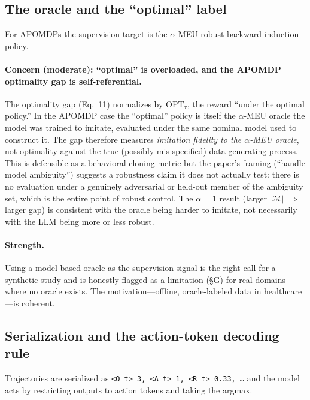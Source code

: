 \documentclass[11pt]{article}
\begin{document}
\subsection{The oracle and the ``optimal'' label}

For APOMDPs the supervision target is the $\alpha$-MEU robust-backward-induction policy.

\paragraph{Concern (moderate): ``optimal'' is overloaded, and the APOMDP optimality gap is
self-referential.} The optimality gap (Eq.\ 11) normalizes by $\mathrm{OPT}_\tau$, the reward
``under the optimal policy.'' In the APOMDP case the ``optimal'' policy is itself the
$\alpha$-MEU oracle the model was trained to imitate, evaluated under the same nominal
model used to construct it. The gap therefore measures \emph{imitation fidelity to the
$\alpha$-MEU oracle}, not optimality against the true (possibly mis-specified) data-generating
process. This is defensible as a behavioral-cloning metric but the paper's framing
(``handle model ambiguity'') suggests a robustness claim it does not actually test: there is
no evaluation under a genuinely adversarial or held-out member of the ambiguity set, which
is the entire point of robust control. The $\alpha=1$ result (larger $|\mathcal{M}|$
$\Rightarrow$ larger gap) is consistent with the oracle being harder to imitate, not
necessarily with the LLM being more or less robust.

\paragraph{Strength.} Using a model-based oracle as the supervision signal is the right call
for a synthetic study and is honestly flagged as a limitation (\S G) for real domains where
no oracle exists. The motivation---offline, oracle-labeled data in healthcare---is coherent.

\subsection{Serialization and the action-token decoding rule}

Trajectories are serialized as \texttt{<O\_t> 3, <A\_t> 1, <R\_t> 0.33, \dots} and the model
acts by restricting outputs to action tokens and taking the argmax.
\end{document}
